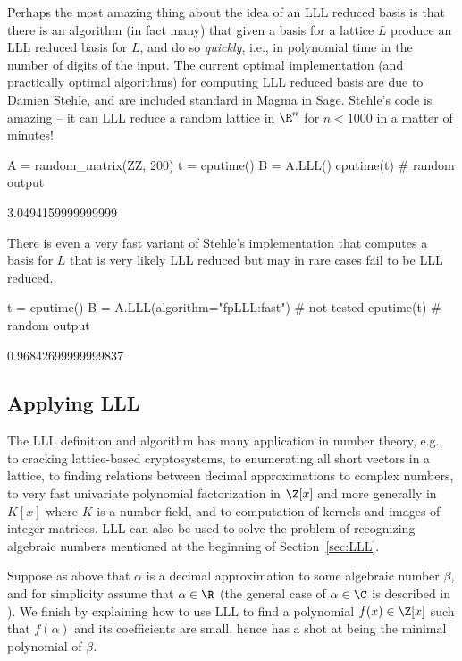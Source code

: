 Perhaps the most amazing thing about the idea of an LLL
reduced basis is that there is an algorithm (in fact many)
that given a basis for a lattice $L$ produce an LLL reduced
basis for $L$, and do so {\em quickly}, i.e., in polynomial
time in the number of digits of the input.   The current
optimal implementation (and practically optimal algorithms)
for computing LLL reduced basis are due to Damien Stehle,
and are included standard in Magma in Sage.   Stehle's code
is amazing -- it can LLL reduce a random lattice in $\R^{n}$
for $n<1000$ in a matter of minutes!
\begin{sagecode}
\begin{sagecell}
A = random_matrix(ZZ, 200)
t = cputime()
B = A.LLL()
cputime(t)     # random output
\end{sagecell}
\begin{sageout}
3.0494159999999999
\end{sageout}
\end{sagecode}

\noindent{}There is even a very fast variant of Stehle's implementation that computes a basis for $L$ that is very likely LLL reduced but may in rare
cases fail to be LLL reduced.

\begin{sagecode}
\begin{sagecell}
t = cputime()
B = A.LLL(algorithm="fpLLL:fast")   # not tested
cputime(t)      # random output
\end{sagecell}
\begin{sageout}
0.96842699999999837
\end{sageout}
\end{sagecode}

\subsection{Applying LLL}

The LLL definition and algorithm has many application in
number theory, e.g., to cracking lattice-based cryptosystems,
to enumerating all short vectors in a lattice, to finding relations
between decimal approximations to complex numbers, to very
fast univariate polynomial factorization in $\Z[x]$ and more
generally in $K[x]$ where $K$ is a number field, and to
computation of kernels and images of integer matrices.  LLL
can also be used to solve the problem of recognizing algebraic
numbers mentioned at the beginning of Section~\ref{sec:LLL}.

Suppose as above that $\alpha$ is a decimal approximation
to some algebraic number $\beta$, and for simplicity
assume that $\alpha\in\R$ (the general case of $\alpha \in \C$
is described in \cite{cohen:course_ant}).
We finish by explaining how to use LLL to find a polynomial
$f(x) \in \Z[x]$ such that $f(\alpha)$ and its coefficients
are small, hence has a shot at being the minimal polynomial
of $\beta$.

